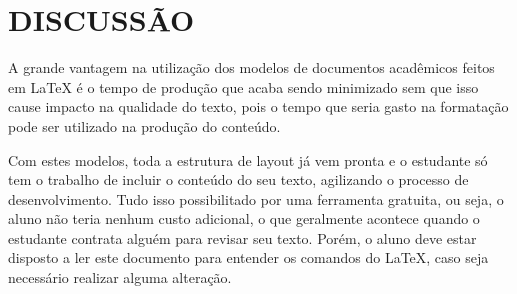 \newpage
\section{DISCUSSÃO}
A grande vantagem na utilização dos modelos de documentos acadêmicos feitos em LaTeX é o tempo de produção que acaba sendo minimizado sem que isso cause impacto na qualidade do texto, pois o tempo que seria gasto na formatação pode ser utilizado na produção do conteúdo.

Com estes modelos, toda a estrutura de layout já vem pronta e o estudante só tem o trabalho de incluir o conteúdo do seu texto, agilizando o processo de desenvolvimento. Tudo isso possibilitado por uma ferramenta gratuita, ou seja, o aluno não teria nenhum custo adicional, o que geralmente acontece quando o estudante contrata alguém para revisar seu texto. Porém, o aluno deve estar disposto a ler este documento para entender os comandos do LaTeX, caso seja necessário realizar alguma alteração.
